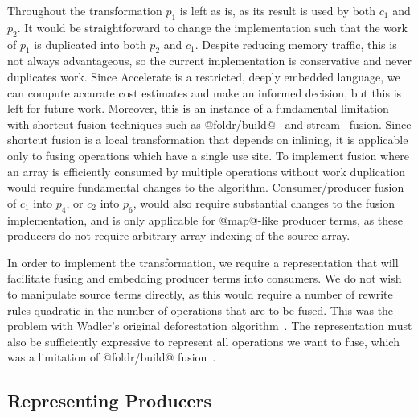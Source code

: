 Throughout the transformation $p_1$ is left as is, as its result is used by both
$c_1$ and $p_2$. It would be straightforward to change the implementation such
that the work of $p_1$ is duplicated into both $p_2$ and $c_1$. Despite reducing
memory traffic, this is not always advantageous, so the current implementation
is conservative and never duplicates work. Since Accelerate is a restricted,
deeply embedded language, we can compute accurate cost estimates and make an
informed decision, but this is left for future work. Moreover, this is an
instance of a fundamental limitation with shortcut fusion techniques such as
@foldr/build@~\cite{Gill:1993de} and stream~\cite{Coutts:2007kp} fusion. Since
shortcut fusion is a local transformation that depends on inlining, it is
applicable only to fusing operations which have a single use site. To implement
fusion where an array is efficiently consumed by multiple operations without
work duplication would require fundamental changes to the algorithm.
%
Consumer/producer fusion of $c_1$ into $p_4$, or $c_2$ into $p_6$, would also
require substantial changes to the fusion implementation, and is only applicable
for @map@-like producer terms, as these producers do not require arbitrary array
indexing of the source array.



In order to implement the transformation, we require a representation that will
facilitate fusing and embedding producer terms into consumers. We do not wish to
manipulate source terms directly, as this would require a number of rewrite
rules quadratic in the number of operations that are to be fused. This was the
problem with Wadler's original deforestation
algorithm~\cite{Wadler:1981hy,Wadler:1990ix}. The representation must also be
sufficiently expressive to represent all operations we want to fuse, which was a
limitation of @foldr/build@ fusion~\cite{Gill:1993de}.


\subsection{Representing Producers}
\label{sec:representing_producers}

